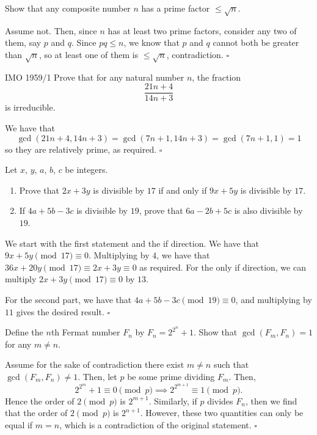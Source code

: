 \documentclass{article}
\begin{document}
\begin{problem}[1.12.1]{}
Show that any composite number $n$ has a prime factor $\le \sqrt{n}$.
\end{problem}
Assume not. Then, since $n$ has at least two prime factors, consider any two of them, say $p$ and $q$. Since $pq \le n$, we know that $p$ and $q$ cannot both be greater than $\sqrt{n}$, so at least one of them is $\le \sqrt{n}$, contradiction. $\square$

\newpage

\begin{problem}[1.12.2]{IMO 1959/1}
Prove that for any natural number $n$, the fraction \[\dfrac{21n + 4}{14n + 3}\] is irreducible.
\end{problem}
We have that \[\gcd(21n+4, 14n+3) = \gcd(7n+1, 14n+3) = \gcd(7n+1, 1) = 1\] so they are relatively prime, as required. $\square$

\begin{problem}[1.12.3]{}
Let $x$, $y$, $a$, $b$, $c$ be integers.
\begin{enumerate}
\item Prove that $2x + 3y$ is divisible by $17$ if and only if $9x + 5y$ is divisible by $17$.
\item If $4a + 5b - 3c$ is divisible by $19$, prove that $6a - 2b + 5c$ is also divisible by $19$.
\end{enumerate}
\end{problem}
We start with the first statement and the if direction. We have that $9x+5y \pmod{17} \equiv 0$. Multiplying by $4$, we have that $36x+20y \pmod{17} \equiv 2x + 3y \equiv 0$ as required. For the only if direction, we can multiply $2x+3y \pmod{17} \equiv 0$ by $13$. 

For the second part, we have that $4a+5b-3c \pmod{19} \equiv 0$, and multiplying by $11$ gives the desired result. $\square$

\begin{problem}[1.12.4]{}
Define the $n$th Fermat number $F_n$ by $F_n = 2^{2^n}+ 1$. Show that $\gcd(F_m, F_n) = 1$ for any $m \neq n$.
\end{problem}
Assume for the sake of contradiction there exist $m \neq n$ such that $\gcd(F_m, F_n) \neq 1$. Then, let $p$ be some prime dividing $F_m$. Then, \[2^{2^m}+1 \equiv 0 \pmod{p} \implies 2^{2^{m+1}} \equiv 1 \pmod{p}.\] Hence the order of $2 \pmod{p}$ is $2^{m+1}$. Similarly, if $p$ divides $F_n$, then we find that the order of $2 \pmod{p}$ is $2^{n+1}$. However, these two quantities can only be equal if $m = n$, which is a contradiction of the original statement. $\square$
\end{document}
